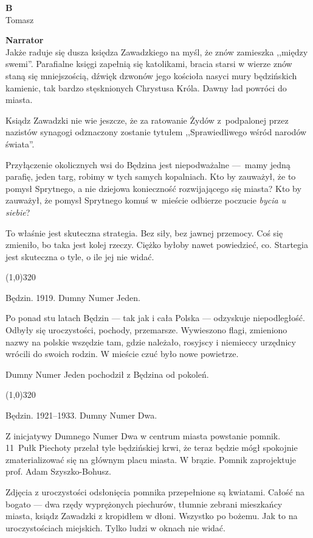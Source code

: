 \documentclass[11pt,a4paper,oneside]{article}
\begin{document}
\textbf{B}\\
Tomasz


\textbf{Narrator}\\
Jakże raduje się dusza księdza Zawadzkiego na myśl, że znów zamieszka
,,między swemi''.  Parafialne księgi zapełnią się katolikami, bracia
starsi w wierze znów staną się mniejszością, dźwięk dzwonów jego
kościoła nasyci mury będzińskich kamienic, tak bardzo stęsknionych
Chrystusa Króla. Dawny ład powróci do miasta. %

Ksiądz Zawadzki nie wie jeszcze, że za ratowanie Żydów z~podpalonej
przez nazistów synagogi odznaczony zostanie tytułem ,,Sprawiedliwego
wśród narodów świata''.

Przyłączenie okolicznych wsi do Będzina jest niepodważalne \mbox{---}~mamy
jedną parafię, jeden targ, robimy w  tych samych kopalniach. Kto by
zauważył, że to pomysł Sprytnego, a nie dziejowa konieczność
rozwijającego się miasta?  Kto by zauważył, że pomysł Sprytnego komuś
w~mieście odbierze poczucie \emph{bycia u siebie}?

To właśnie jest skuteczna strategia. Bez siły, bez jawnej przemocy.
Coś się zmieniło, bo taka jest kolej rzeczy.  Ciężko byłoby nawet
powiedzieć, co. Startegia jest skuteczna o tyle, o ile jej nie widać. 

\line(1,0){320}

Będzin. 1919. Dumny Numer Jeden.

Po ponad stu latach Będzin --- tak jak i cała Polska --- odzyskuje
niepodległość. Odbyły się uroczystości, pochody, przemarsze.
Wywieszono flagi, zmieniono nazwy na polskie wszędzie tam, gdzie
należało, rosyjscy i niemieccy urzędnicy wrócili do swoich rodzin. W
mieście czuć było nowe powietrze.

Dumny Numer Jeden pochodził z Będzina od pokoleń. 


\line(1,0){320}

Będzin. 1921--1933. Dumny Numer Dwa.

Z inicjatywy Dumnego Numer Dwa w centrum miasta powstanie pomnik.
11~Pułk Piechoty przelał tyle będzińskiej krwi, że teraz będzie mógł
spokojnie zmaterializować się na głównym placu miasta. W brązie.
Pomnik zaprojektuje prof. Adam Szyszko-Bohusz.

Zdjęcia z uroczystości odsłonięcia pomnika przepełnione są kwiatami.
Całość na bogato --- dwa rzędy wyprężonych piechurów, tłumnie zebrani
mieszkańcy miasta, ksiądz Zawadzki z kropidłem w dłoni.  Wszystko po
bożemu.  Jak to na uroczystościach miejskich.  Tylko ludzi w oknach
nie widać.
\end{document}
